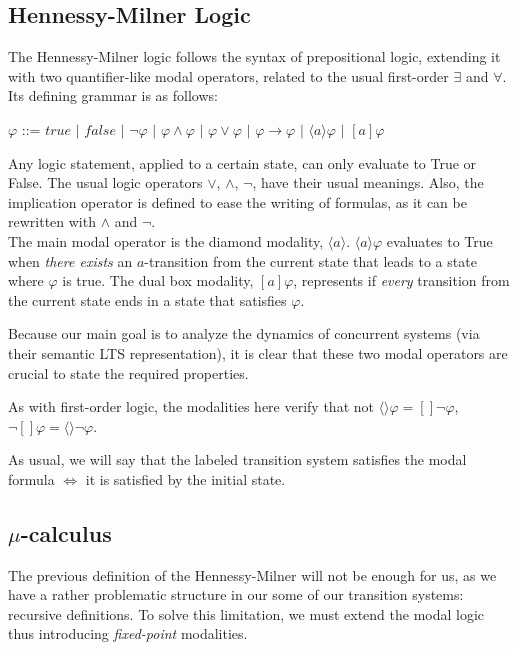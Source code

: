 \documentclass[11pt]{article}
\theoremstyle{definition}
\theoremstyle{plain}
\theoremstyle{definition}
\let\temp\phi
\let\phi\varphi
\let\varphi\temp
\begin{document}
\subsection{Hennessy-Milner Logic}
The Hennessy-Milner logic follows the syntax of prepositional logic, extending it with two quantifier-like  modal operators, related to the usual first-order $ \exists $ and $ \forall $. Its defining grammar is as follows:

\begin{center}
	$ \phi $ ::= $true$ $ \vert $ $false$ $ \vert $ $\neg \phi$ $ \vert $ $\phi \wedge \phi$ $ \vert $ $\phi \vee \phi$ $ \vert $ $\phi \rightarrow \phi$ $ \vert $ $\langle a \rangle\phi$ $ \vert $ $[a]\phi $
\end{center}

Any logic statement, applied to a certain state, can only evaluate to True or False. The usual logic operators $ \vee $, $ \wedge $, $ \neg $, have their usual meanings. Also, the implication operator is defined to ease the writing of formulas, as it can be rewritten with $ \wedge $ and $ \neg $. \\
The main modal operator is the diamond modality, $ \langle a\rangle $. $ \langle a\rangle\phi $ evaluates to True when \emph{there exists} an $ a $-transition from the current state that leads to a state where $ \phi $ is true. The dual box modality, $ [a]\phi$, represents if \emph{every} transition from the current state ends in a state that satisfies $ \phi $.

Because our main goal is to analyze the dynamics of concurrent systems (via their semantic LTS representation), it is clear that these two modal operators are crucial to state the required properties.

As with first-order logic, the modalities here verify that not $ \langle\rangle\phi = []\neg\phi $, $ \neg[]\phi = \langle\rangle\neg\phi $.

As usual, we will say that the labeled transition system satisfies the modal formula $ \iff $ it is satisfied by the initial state.

\subsection{$\mu$-calculus}
The previous definition of the Hennessy-Milner will not be enough for us, as we have a rather problematic structure in our some of our transition systems: recursive definitions. To solve this limitation, we must extend the modal logic thus introducing \emph{fixed-point} modalities.
\end{document}
